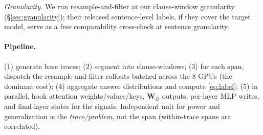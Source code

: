 \documentclass[11pt]{article}
\newcommand{\WO}{\mathbf{W}_O}
\begin{document}
\emph{Granularity.} We run resample-and-filter at our clause-window granularity
(\S\ref{sec:granularity}); their released sentence-level labels, if they cover the target model, serve
as a free comparability cross-check at sentence granularity.

\paragraph{Pipeline.} (1) generate base traces; (2) segment into clause-windows; (3) for each span,
dispatch the resample-and-filter rollouts batched across the 8 GPUs (the dominant cost); (4) aggregate
answer distributions and compute \eqref{eq:label}; (5) in parallel, hook attention
weights/values/keys, $\WO$ outputs, per-layer MLP writes, and final-layer states for the signals.
Independent unit for power and generalization is the \emph{trace/problem}, not the span (within-trace
spans are correlated).
\end{document}
